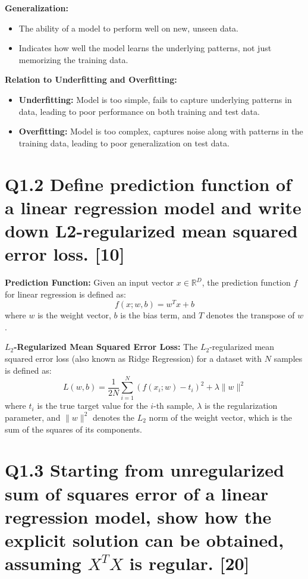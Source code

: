 \documentclass[11pt]{article}
\begin{document}
\textbf{Generalization:}
\begin{itemize}
    \item The ability of a model to perform well on new, unseen data.
    \item Indicates how well the model learns the underlying patterns, not just memorizing the training data.
\end{itemize}

\textbf{Relation to Underfitting and Overfitting:}
\begin{itemize}
    \item \textbf{Underfitting:} Model is too simple, fails to capture underlying patterns in data, leading to poor performance on both training and test data.
    \item \textbf{Overfitting:} Model is too complex, captures noise along with patterns in the training data, leading to poor generalization on test data.
\end{itemize}



\section{Q1.2 Define prediction function of a linear regression model and write down L2-regularized mean squared error loss. [10]}

\textbf{Prediction Function:}
Given an input vector \( x \in \mathbb{R}^D \), the prediction function \( f \) for linear regression is defined as:
\[
f(x; w, b) = w^T x + b
\]
where \( w \) is the weight vector, \( b \) is the bias term, and \( T \) denotes the transpose of \( w \).

\textbf{\( L_2 \)-Regularized Mean Squared Error Loss:}
The \( L_2 \)-regularized mean squared error loss (also known as Ridge Regression) for a dataset with \( N \) samples is defined as:
\[
L(w, b) = \frac{1}{2N} \sum_{i=1}^{N} (f(x_i; w) - t_i)^2 + \lambda \| w \|^2
\]
where \( t_i \) is the true target value for the \( i \)-th sample, \( \lambda \) is the regularization parameter, and \( \| w \|^2 \) denotes the \( L_2 \) norm of the weight vector, which is the sum of the squares of its components.


\section{Q1.3 Starting from unregularized sum of squares error of a linear regression model, show how the explicit solution can be obtained, assuming \(X^TX\) is regular. [20]}
\end{document}
